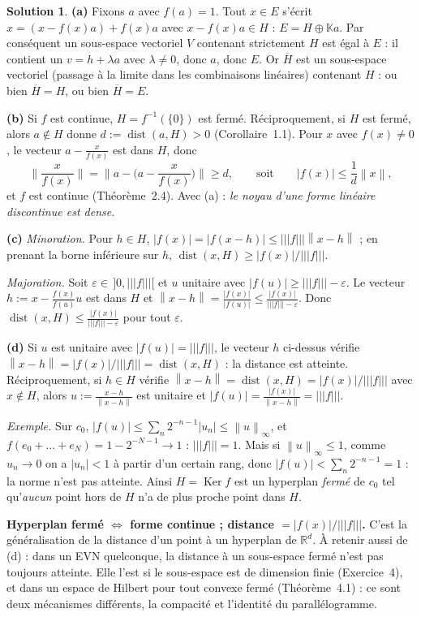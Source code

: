 \documentclass[11pt,a4paper]{article}
\newcommand{\R}{\mathbb{R}}
\newcommand{\K}{\mathbb{K}}
\newcommand{\adh}[1]{\overline{#1}}
\newcommand{\dist}{\operatorname{dist}}
\newcommand{\norm}[1]{\left\|#1\right\|}
\newcommand{\opnorm}[1]{|\!|\!|#1|\!|\!|}
\DeclareMathOperator{\Ker}{Ker}
\theoremstyle{definition}
\newtheorem*{solution}{Solution}
\begin{document}
\begin{solution}
\noindent\textbf{(a)} Fixons $a$ avec $f(a)=1$. Tout $x\in E$ s'écrit $x=(x-f(x)a)+f(x)a$ avec $x-f(x)a\in H$ : $E=H\oplus\K a$. Par conséquent un sous-espace vectoriel $V$ contenant strictement $H$ est égal à $E$ : il contient un $v=h+\lambda a$ avec $\lambda\ne0$, donc $a$, donc $E$. Or $\adh H$ est un sous-espace vectoriel (passage à la limite dans les combinaisons linéaires) contenant $H$ : ou bien $\adh H=H$, ou bien $\adh H=E$.

\medskip
\noindent\textbf{(b)} Si $f$ est continue, $H=f^{-1}(\{0\})$ est fermé. Réciproquement, si $H$ est fermé, alors $a\notin H$ donne $d:=\dist(a,H)>0$ (Corollaire~1.1). Pour $x$ avec $f(x)\ne0$, le vecteur $a-\frac x{f(x)}$ est dans $H$, donc
\[
\Big\|\frac x{f(x)}\Big\|=\Big\|a-\Big(a-\frac x{f(x)}\Big)\Big\|\ge d,\qquad\text{soit}\qquad|f(x)|\le\frac1d\norm x ,
\]
et $f$ est continue (Théorème~2.4). Avec (a) : \emph{le noyau d'une forme linéaire discontinue est dense}.

\medskip
\noindent\textbf{(c)} \emph{Minoration.} Pour $h\in H$, $|f(x)|=|f(x-h)|\le\opnorm f\norm{x-h}$ ; en prenant la borne inférieure sur $h$, $\dist(x,H)\ge|f(x)|/\opnorm f$.

\emph{Majoration.} Soit $\varepsilon\in\,]0,\opnorm f[$ et $u$ unitaire avec $|f(u)|\ge\opnorm f-\varepsilon$. Le vecteur $h:=x-\frac{f(x)}{f(u)}u$ est dans $H$ et $\norm{x-h}=\frac{|f(x)|}{|f(u)|}\le\frac{|f(x)|}{\opnorm f-\varepsilon}$. Donc $\dist(x,H)\le\frac{|f(x)|}{\opnorm f-\varepsilon}$ pour tout $\varepsilon$.

\medskip
\noindent\textbf{(d)} Si $u$ est unitaire avec $|f(u)|=\opnorm f$, le vecteur $h$ ci-dessus vérifie $\norm{x-h}=|f(x)|/\opnorm f=\dist(x,H)$ : la distance est atteinte. Réciproquement, si $h\in H$ vérifie $\norm{x-h}=\dist(x,H)=|f(x)|/\opnorm f$ avec $x\notin H$, alors $u:=\frac{x-h}{\norm{x-h}}$ est unitaire et $|f(u)|=\frac{|f(x)|}{\norm{x-h}}=\opnorm f$.

\emph{Exemple.} Sur $c_0$, $|f(u)|\le\sum_n2^{-n-1}|u_n|\le\norm u_\infty$, et $f(e_0+\dots+e_N)=1-2^{-N-1}\to1$ : $\opnorm f=1$. Mais si $\norm u_\infty\le1$, comme $u_n\to0$ on a $|u_n|<1$ à partir d'un certain rang, donc $|f(u)|<\sum_n2^{-n-1}=1$ : la norme n'est pas atteinte. Ainsi $H=\Ker f$ est un hyperplan \emph{fermé} de $c_0$ tel qu'\emph{aucun} point hors de $H$ n'a de plus proche point dans $H$.
\end{solution}

\begin{pointcle}
\textbf{Hyperplan fermé $\iff$ forme continue ; distance $=|f(x)|/\opnorm f$.} C'est la généralisation de la distance d'un point à un hyperplan de $\R^d$. À retenir aussi de (d) : dans un EVN quelconque, la distance à un sous-espace fermé n'est pas toujours atteinte. Elle l'est si le sous-espace est de dimension finie (Exercice~4), et dans un espace de Hilbert pour tout convexe fermé (Théorème~4.1) : ce sont deux mécanismes différents, la compacité et l'identité du parallélogramme.
\end{pointcle}
\end{document}
